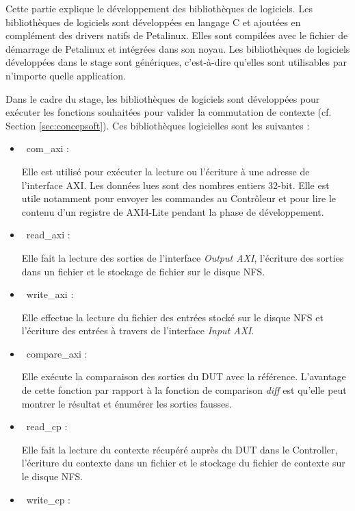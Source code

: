 Cette partie explique le développement des bibliothèques de logiciels.
Les bibliothèques de logiciels sont développées en langage C et ajoutées en complément
des drivers natifs de Petalinux. Elles sont compilées avec le fichier de démarrage de Petalinux et intégrées dans son noyau. 
Les bibliothèques de logiciels développées dans le stage sont génériques, c'est-à-dire qu'elles
sont utilisables par n'importe quelle application. 

Dans le cadre du stage, les bibliothèques de logiciels sont développées pour exécuter les fonctions
souhaitées pour valider la commutation de contexte (cf. Section \ref{sec:concepsoft}).
Ces bibliothèques logicielles sont les suivantes : 

\begin{itemize}
	\item\
	com\_axi :
	
	Elle est utilisé pour exécuter la lecture ou l'écriture à une adresse de l'interface AXI. Les données lues sont
	des nombres entiers 32-bit. Elle est utile notamment pour envoyer les commandes au Contrôleur et pour lire
	le contenu d'un registre de AXI4-Lite pendant la phase de développement.

	\item\	
	read\_axi :
	
	Elle fait la lecture des sorties de l'interface \emph{Output AXI}, 
	l'écriture des sorties dans un fichier et le stockage de fichier sur le disque NFS.
	
	\item\
	write\_axi :
	
	Elle effectue la lecture du fichier des entrées stocké sur le disque NFS et l'écriture des entrées
	à travers de l'interface \emph{Input AXI}.

	\item\
	compare\_axi :
	
	Elle exécute la comparaison des sorties du DUT avec la référence.
	L'avantage de cette fonction par rapport à la fonction de comparison \emph{diff} 
	est qu'elle peut montrer le résultat et énumérer les sorties fausses.

	\item\
	read\_cp :

	Elle fait la lecture du contexte récupéré auprès du DUT dans le Controller, 
	l'écriture du contexte dans un fichier et le stockage du fichier de contexte sur le disque NFS.
	
	\item\
	write\_cp :
	

\end{itemize}
